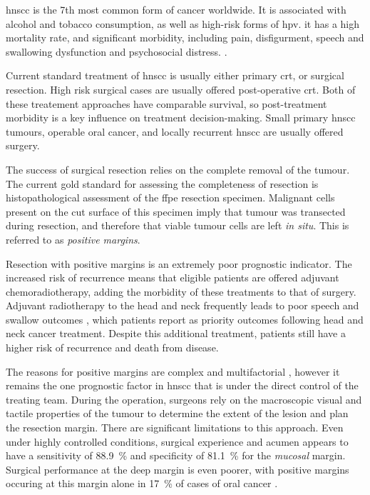 
\Gls{hnscc} is the 7th most common form of cancer worldwide. 
It is associated with alcohol and tobacco consumption, as well as high-risk forms of \gls{hpv}.
it has a high mortality rate, and significant morbidity, including pain, disfigurment, speech and swallowing dysfunction and psychosocial distress. \cite{chowHeadNeckCancer2020}.

Current standard treatment of \gls{hnscc} is usually either primary \gls{crt}, or surgical resection. 
High risk surgical cases are usually offered post-operative \gls{crt}.
Both of these treatement approaches have comparable survival, so post-treatment morbidity is a key influence on treatment decision-making.
Small primary \gls{hnscc} tumours, operable oral cancer, and locally recurrent \gls{hnscc} are usually offered surgery\cite{niceCancerUpperAerodigestive2018, kerawalaOralCavityLip2016}.

The success of surgical resection relies on the complete removal of the tumour.
The current gold standard for assessing the completeness of resection is histopathological assessment of the \gls{ffpe} resection specimen\cite{helliwellPathologicalAspectsAssessment2016}.
Malignant cells present on the cut surface of this specimen imply that tumour was transected during resection, and therefore that viable tumour cells are left \textit{in situ}.
This is referred to as \emph{positive margins}.

Resection with positive margins is an extremely poor prognostic indicator\cite{hinniSurgicalMarginsHead2013a}.
The increased risk of recurrence means that eligible patients are offered adjuvant chemoradiotherapy, adding the morbidity of these treatments to that of surgery.
Adjuvant radiotherapy to the head and neck frequently leads to poor speech and swallow outcomes \cite{machtayFactorsAssociatedSevere2008, wangPharyngoesophagealStrictureTreatment2012}, which patients report as priority outcomes following head and neck cancer treatment\cite{wilsonDysphagiaNonsurgicalHead2011}.
Despite this additional treatment, patients still have a higher risk of recurrence and death from disease.

The reasons for positive margins are complex and multifactorial \cite{hinniSurgicalMarginsHead2013a, upileUncertaintySurgicalMargin2007}, however it remains the one prognostic factor in \gls{hnscc} that is under the direct control of the treating team.
During the operation, surgeons rely on the macroscopic visual and tactile properties of the tumour to determine the extent of the lesion and plan the resection margin.
There are significant limitations to this approach. 
Even under highly controlled conditions, surgical experience and acumen appears to have a sensitivity of \SI{88.9}{\percent} and specificity of \SI{81.1}{\percent} for the \emph{mucosal} margin\cite{chaturvedip.GrossExaminationSurgeon2014}.
Surgical performance at the deep margin is even poorer, with positive margins occuring at this margin alone in \SI{17}{\percent} of cases of oral cancer \cite{woolgarHistopathologicalAppraisalSurgical2005}.

